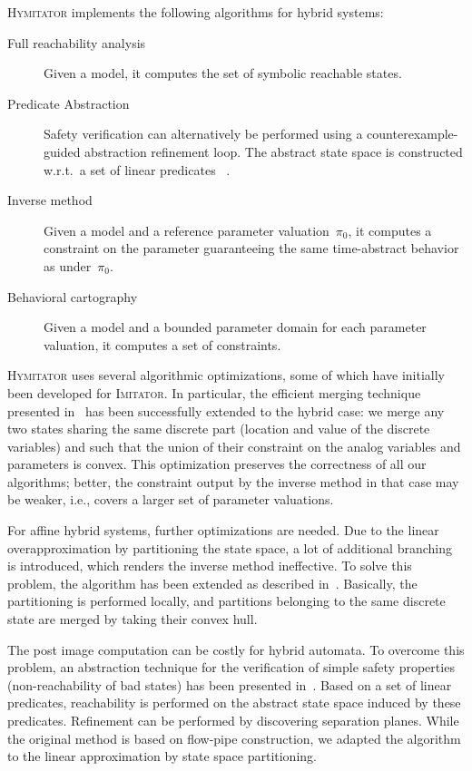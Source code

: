 \documentclass{llncs}
\newcommand{\pio}{\pi_0}
\newcommand{\imitator}{\textsc{Imitator}}
\newcommand{\hymitator}{\textsc{Hymitator}}
\begin{document}
\hymitator{} implements the following algorithms for hybrid systems:
\begin{description}
	\item[Full reachability analysis] Given a model, it computes the set of symbolic reachable states.
\item[Predicate Abstraction] Safety verification can alternatively be performed using a counterexample-guided abstraction refinement loop. The abstract state space is constructed w.r.t.~a set of linear predicates%
	~\cite{ADI2006}.
	\item[Inverse method] Given a model and a reference parameter valuation~$\pio$, it computes a constraint on the parameter guaranteeing the same time-abstract behavior as under~$\pio$.
	\item[Behavioral cartography] Given a model and a bounded parameter domain for each parameter valuation, it computes a set of constraints.%
\end{description}

\hymitator{} uses several algorithmic optimizations, some of which have initially been developed for \imitator{}.
In particular, the efficient merging technique presented in~\cite{AFS12} has been successfully extended to the hybrid case: we merge any two states sharing the same discrete part (location and value of the discrete variables) and such that the union of their constraint on the analog variables and parameters is convex.
This optimization preserves the correctness of all our algorithms; better, the constraint output by the inverse method in that case may be weaker, i.e., covers a larger set of parameter valuations.

For affine hybrid systems, further optimizations are needed. Due to the linear overapproximation by partitioning the state space, a lot of additional branching is introduced, which renders the inverse method ineffective. To solve this problem, the algorithm has been extended as described in~\cite{FK11}. Basically, the partitioning is performed locally, and partitions belonging to the same discrete state are merged by taking their convex hull. 

The post image computation can be costly for hybrid automata. To overcome this problem, an abstraction technique for the verification of simple safety  properties (non-reachability of bad states) has been presented in~\cite{ADI2006}. Based on a set of linear predicates, reachability is performed on the abstract state space induced by these predicates. Refinement can be performed by discovering separation planes. While the original method is based on flow-pipe construction, we adapted the algorithm to the linear approximation by state space partitioning. 
\end{document}

